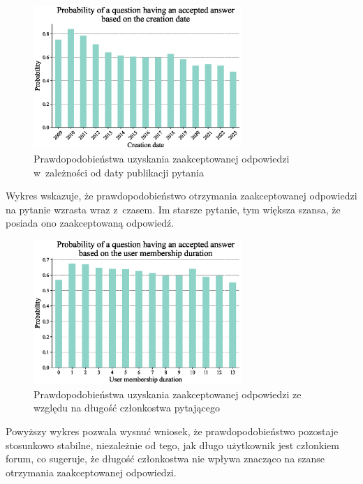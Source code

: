 \documentclass[12pt]{article}
\begin{document}
	\begin{figure}[H]
		\centering
		\includegraphics[width=0.7\textwidth]{question_creation_date}
		\caption{Prawdopodobieństwa uzyskania zaakceptowanej odpowiedzi w~zależności od daty publikacji pytania}
		\label{fig:prawdopodobienstwa-uzyskania-odpowiedzi-data}
	\end{figure}
	Wykres wskazuje, że prawdopodobieństwo otrzymania zaakceptowanej odpowiedzi na pytanie wzrasta wraz z~czasem.
	Im starsze pytanie, tym większa szansa, że posiada ono zaakceptowaną odpowiedź.

	\begin{figure}[H]
		\centering
		\includegraphics[width=0.7\textwidth]{user_experience}
		\caption{Prawdopodobieństwa uzyskania zaakceptowanej odpowiedzi ze względu na długość członkostwa pytającego}
		\label{fig:prawdopodobienstwa-uzyskania-odpowiedzi-czlonkostwo}
	\end{figure}
	Powyższy wykres pozwala wysnuć wniosek, że prawdopodobieństwo pozostaje stosunkowo stabilne, niezależnie od tego, jak długo użytkownik jest członkiem forum, co sugeruje, że długość członkostwa nie wpływa znacząco na szanse otrzymania zaakceptowanej odpowiedzi.
\end{document}
